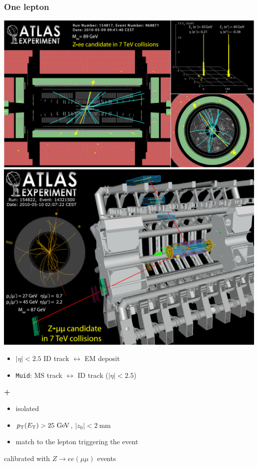 \begin{frame}\frametitle{One lepton}
\footnotesize\centering

\includegraphics[width=.5\textwidth,height=0.5\textheight]{pics/Zee}
\includegraphics[width=.5\textwidth,height=0.5\textheight]{pics/Zmumu}

\begin{minipage}{.5\textwidth}\centering

\begin{itemize}
\item $|\eta|<2.5$ ID track $\leftrightarrow$ EM deposit
\end{itemize}

\end{minipage}\begin{minipage}{.5\textwidth}\centering

\begin{itemize}
\item \texttt{Muid}: MS track $\leftrightarrow$ ID track ($|\eta|<2.5$)
\end{itemize}

\end{minipage}

\begin{minipage}{.5\textwidth}\centering

{\cccolor \bfseries \large +}\\
\begin{itemize}
\item isolated
\item $\pt (\et) > 25\gev$, $|z_0|<2~$mm
\item match to the lepton triggering the event
\end{itemize}
\end{minipage}


calibrated with $Z\to ee (\mu\mu)$ events

\end{frame}



